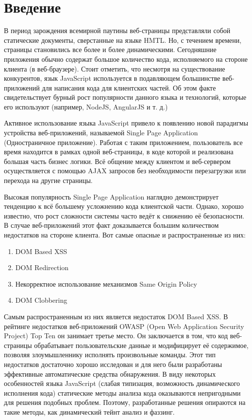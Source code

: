 
\chapter{Введение}\label{Introduction}

В период зарождения всемирной паутины веб-страницы представляли собой статические документы, сверстанные на языке HMTL. Но, с течением времени, страницы становились все более и более динамическими. Сегодняшние приложения обычно содержат большое количество кода, исполняемого на стороне клиента (в веб-браузере). Стоит отметить, что несмотря на существование конкурентов, язык JavaScript используется в подавляющем большинстве веб-приложений для написания кода для клиентских частей. Об этом факте свидетельствует бурный рост популярности данного языка и технологий, которые его используют (например, NodeJS, AngularJS и т. д.)


Активное использование языка JavaScript привело к появлению новой парадигмы устройства веб-приложений, называемой Single Page Application (Одностраничное приложение). Работая с таким приложением, пользователь все время находится в рамках одной веб-страницы, в коде которой и реализована большая часть бизнес логики. Всё общение между клиентом и веб-сервером осуществляется с помощью AJAX запросов без необходимости перезагрузки или перехода на другие страницы.


Высокая популярность Single Page Application наглядно демонстрирует тенденцию к всё большему усложнению кода клиентской части. Однако, хорошо известно, что рост сложности системы часто ведёт к снижению её безопасности. В случае веб-приложений этот факт доказывается большим количеством недостатков на стороне клиента. Вот самые опасные и распространенные из них:

\begin{enumerate}
	\item DOM Based XSS
	\item DOM Redirection
	\item Некорректное использование механизмов Same Origin Policy
	\item DOM Clobbering
\end{enumerate}



Самым распространенным из них является недостаток DOM Based XSS. В рейтинге недостатков веб-приложений OWASP (Open Web Application Security Project) Top Ten он занимает третье место. Он заключается в том, что код веб-страницы обрабатывает пользовательские данные и модифицирует её содержимое, позволяя злоумышленнику исполнять произвольные команды. Этот тип недостатков достаточно хорошо исследован и для него были разработаны эффективные автоматические средства обнаружения. В виду некоторых особенностей языка JavaScript (слабая типизация, возможность динамического исполнения кода) статические методы анализа кода оказываются непригодными для решения подобных проблем. Поэтому, разработанные решения опираются на такие методы, как динамический тейнт анализ и фаззинг.


